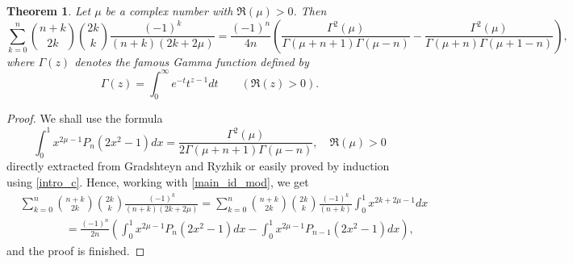 \documentclass[11pt,reqno]{amsart}
\theoremstyle{plain}
\numberwithin{equation}{section}
\newtheorem{theorem}[thm]{Theorem}
\begin{document}
\begin{theorem}\label{main_int_thm1}
Let $\mu$ be a complex number with $\Re(\mu)> 0$. Then
\begin{equation}\label{main_int_id1}
\sum_{k=0}^{n} \binom{n+k}{2k} \binom{2k}{k} \frac{(-1)^k}{(n+k)(2k+2\mu)} 
= \frac{(-1)^n}{4n} \left (\frac{\Gamma^2(\mu)}{\Gamma(\mu+n+1)\Gamma(\mu-n)} - \frac{\Gamma^2(\mu)}{\Gamma(\mu+n)\Gamma(\mu+1-n)} \right ),
\end{equation}
where $\Gamma(z)$ denotes the famous Gamma function defined by
\begin{equation*}
\Gamma(z) = \int_0^\infty e^{-t} t^{z-1} dt \qquad (\Re(z)>0).
\end{equation*}
\end{theorem}
\begin{proof}
We shall use the formula
$$\int_0^1 x^{2\mu -1}P_n(2x^2-1) dx = \frac{\Gamma^2(\mu)}{2 \Gamma(\mu+n+1)\Gamma(\mu-n)}, \quad \Re(\mu)>0$$
directly extracted from Gradshteyn and Ryzhik \cite[Equation (7.233)]{GrRy07} or easily proved by induction using \eqref{intro_c}.
Hence, working with \eqref{main_id_mod}, we get
\begin{align*}
&\sum_{k=0}^{n} \binom{n+k}{2k} \binom{2k}{k} \frac{(-1)^k}{(n+k)(2k+2\mu)} = \sum_{k=0}^{n} \binom{n+k}{2k} \binom{2k}{k} \frac{(-1)^k}{(n+k)} \int_0^1 x^{2k+2\mu-1} dx \\
&\qquad\qquad = \frac{(-1)^n}{2n} \left (\int_0^1 x^{2\mu -1}P_n(2x^2-1) dx - \int_0^1 x^{2\mu -1}P_{n-1}(2x^2-1) dx \right ),
\end{align*}
and the proof is finished.
\end{proof}
\end{document}

